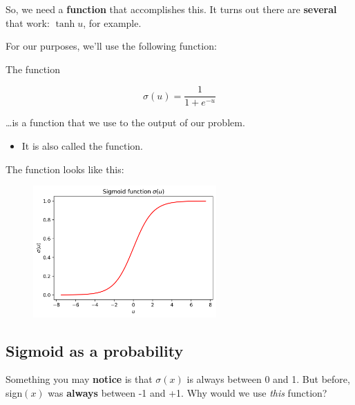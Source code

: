         So, we need a \textbf{function} that accomplishes this. It turns out there are \textbf{several} that work: $\tanh{u}$, for example.
        
        For our purposes, we'll use the following function:\\
        
        \begin{definition}
            The  function
            
            \begin{equation*}
                \sigma(u) = \frac{1}{1+e^{-u}}
            \end{equation*}
            
            \ldots is a  function that we use to  the output of our  problem.
            
            

            \begin{itemize}
                \item It is also called the  function.
            \end{itemize}
        \end{definition}
        
        The function looks like this:
        
        \begin{figure}[H]
            \centering
            
            \includegraphics[width=70mm,scale=0.5]{images/classification_images/sigmoid_u.png}
        \end{figure}
        
    \subsection{Sigmoid as a probability}
        
        Something you may \textbf{notice} is that $\sigma(x)$ is always between 0 and 1. But before, sign$(x)$ was \textbf{always} between -1 and +1. Why would we use \textit{this} function?
        
